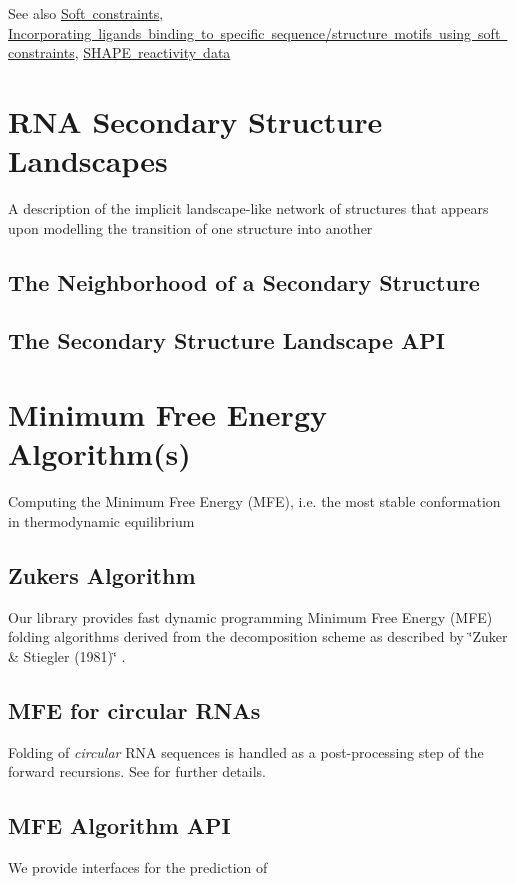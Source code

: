 \begin{DoxySeeAlso}{See also}
\mbox{\hyperlink{group__soft__constraints}{Soft constraints}}, \mbox{\hyperlink{group__constraints__ligand}{Incorporating ligands binding to specific sequence/structure motifs using soft constraints}}, \mbox{\hyperlink{group___s_h_a_p_e__reactivities}{S\+H\+A\+PE reactivity data}}
\end{DoxySeeAlso}
 \hypertarget{secondary_structure_landscape}{}\section{R\+NA Secondary Structure Landscapes}\label{secondary_structure_landscape}
A description of the implicit landscape-\/like network of structures that appears upon modelling the transition of one structure into another\hypertarget{secondary_structure_landscape_landscape_neighborhood}{}\subsection{The Neighborhood of a Secondary Structure}\label{secondary_structure_landscape_landscape_neighborhood}
\hypertarget{secondary_structure_landscape_landscape_api}{}\subsection{The Secondary Structure Landscape A\+PI}\label{secondary_structure_landscape_landscape_api}
 \hypertarget{mfe_algorithm}{}\section{Minimum Free Energy Algorithm(s)}\label{mfe_algorithm}
Computing the Minimum Free Energy (M\+FE), i.\+e. the most stable conformation in thermodynamic equilibrium\hypertarget{mfe_algorithm_zuker_algorithm}{}\subsection{Zuker\textquotesingle{}s Algorithm}\label{mfe_algorithm_zuker_algorithm}
Our library provides fast dynamic programming Minimum Free Energy (M\+FE) folding algorithms derived from the decomposition scheme as described by \char`\"{}\+Zuker \& Stiegler (1981)\char`\"{} \cite{zuker:1981}.\hypertarget{mfe_algorithm_circular_folding}{}\subsection{M\+F\+E for circular R\+N\+As}\label{mfe_algorithm_circular_folding}
Folding of {\itshape circular} R\+NA sequences is handled as a post-\/processing step of the forward recursions. See \cite{hofacker:2006} for further details.\hypertarget{mfe_algorithm_mfe_algorithm_api}{}\subsection{M\+F\+E Algorithm A\+PI}\label{mfe_algorithm_mfe_algorithm_api}
We provide interfaces for the prediction of


